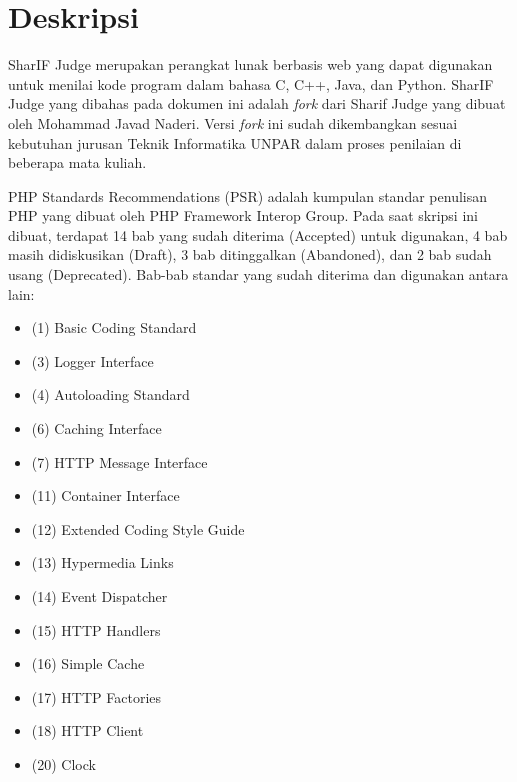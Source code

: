 \documentclass[a4paper,twoside]{article}
\begin{document}
\title{\@judultopik}
\author{\nama \textendash \@npm} 

\newcommand{\nama}{Nicholas Khrisna Sandyawan}
\newcommand{\@npm}{6181801060}
\newcommand{\@judultopik}{Evaluasi PHP Standards Recommendations pada proyek SharIF Judge} %
\newcommand{\jumpemb}{1} %
\newcommand{\tanggal}{24/03/2023}


\maketitle


\section{Deskripsi}
SharIF Judge merupakan perangkat lunak berbasis web yang dapat digunakan untuk menilai kode program dalam bahasa C, C++, Java, dan Python. SharIF Judge yang dibahas pada dokumen ini adalah \textit{fork} dari Sharif Judge yang dibuat oleh Mohammad Javad Naderi. Versi \textit{fork} ini sudah dikembangkan sesuai kebutuhan jurusan Teknik Informatika UNPAR dalam proses penilaian di beberapa mata kuliah.

PHP Standards Recommendations (PSR) adalah kumpulan standar penulisan PHP yang dibuat oleh PHP Framework Interop Group. Pada saat skripsi ini dibuat, terdapat 14 bab yang sudah diterima (Accepted) untuk digunakan, 4 bab masih didiskusikan (Draft), 3 bab ditinggalkan (Abandoned), dan 2 bab sudah usang (Deprecated). Bab-bab standar yang sudah diterima dan digunakan antara lain: 
\begin {itemize}
\item (1) Basic Coding Standard
\item (3) Logger Interface
\item (4) Autoloading Standard
\item (6) Caching Interface
\item (7) HTTP Message Interface
\item (11) Container Interface
\item (12) Extended Coding Style Guide
\item (13) Hypermedia Links
\item (14) Event Dispatcher
\item (15) HTTP Handlers
\item (16) Simple Cache
\item (17) HTTP Factories
\item (18) HTTP Client
\item (20) Clock
\end {itemize}
\end{document}
